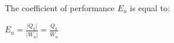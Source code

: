 The coefficient of performance \( E_u \) is equal to:  

\( E_u = \frac{\lvert \dot{Q}_u \rvert}{\lvert \dot{W}_u \rvert} = \frac{\dot{Q}_u}{\dot{W}_u} \)